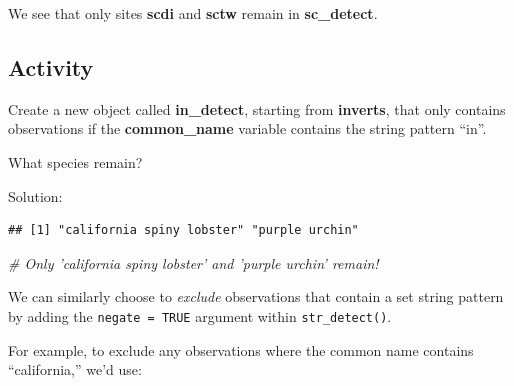 \documentclass[]{book}
\newenvironment{Shaded}{\begin{snugshade}}{\end{snugshade}}
\newcommand{\CommentTok}[1]{\textcolor[rgb]{0.56,0.35,0.01}{\textit{#1}}}
\newcommand{\DataTypeTok}[1]{\textcolor[rgb]{0.13,0.29,0.53}{#1}}
\newcommand{\KeywordTok}[1]{\textcolor[rgb]{0.13,0.29,0.53}{\textbf{#1}}}
\newcommand{\NormalTok}[1]{#1}
\newcommand{\OperatorTok}[1]{\textcolor[rgb]{0.81,0.36,0.00}{\textbf{#1}}}
\newcommand{\OtherTok}[1]{\textcolor[rgb]{0.56,0.35,0.01}{#1}}
\newcommand{\StringTok}[1]{\textcolor[rgb]{0.31,0.60,0.02}{#1}}
\begin{document}
We see that only sites \textbf{scdi} and \textbf{sctw} remain in \textbf{sc\_detect}.

\hypertarget{activity-3}{%
\subsection{Activity}\label{activity-3}}

Create a new object called \textbf{in\_detect}, starting from \textbf{inverts}, that only contains observations if the \textbf{common\_name} variable contains the string pattern ``in''.

What species remain?

Solution:

\begin{Shaded}
\end{Shaded}

\begin{verbatim}
## [1] "california spiny lobster" "purple urchin"
\end{verbatim}

\begin{Shaded}
\begin{Highlighting}[]
\CommentTok{# Only 'california spiny lobster' and 'purple urchin' remain!}
\end{Highlighting}
\end{Shaded}

We can similarly choose to \emph{exclude} observations that contain a set string pattern by adding the \texttt{negate\ =\ TRUE} argument within \texttt{str\_detect()}.

For example, to exclude any observations where the common name contains ``california,'' we'd use:

\begin{Shaded}
\end{Shaded}
\end{document}
